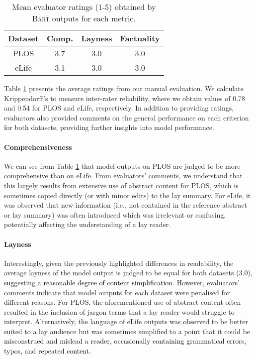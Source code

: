 \documentclass[11pt]{article}
\begin{document}
\begin{table}[]
    \centering
    \begin{tabular}{cccc}
         \hline
         \textbf{Dataset} & \textbf{Comp.} & \textbf{Layness} &\textbf{Factuality} \\ \hline
         PLOS & 3.7 & 3.0 & 3.0 \\
         eLife & 3.1 & 3.0 & 3.0 \\ \hline 
    \end{tabular}
    \caption{Mean evaluator ratings (1-5) obtained by \textsc{Bart} outputs for each metric.}
    \label{tab:human_eval}
\end{table}

Table \ref{tab:human_eval} presents the average ratings from our manual evaluation. We calculate Krippendorff's  to measure inter-rater reliability, where we obtain values of 0.78 and 0.54 for PLOS and eLife, respectively. In addition to providing ratings, evaluators also provided comments on the general performance on each criterion for both datasets, providing further insights into model performance.


\paragraph{Comprehensiveness}


We can see from Table \ref{tab:human_eval} that model outputs on PLOS are judged to be more comprehensive than on eLife. From evaluators' comments, we understand that this largely results from extensive use of abstract content for PLOS, which is sometimes copied directly (or with minor edits) to the lay summary.  
For eLife, it was observed that new information (i.e., not contained in the reference abstract or lay summary) was often introduced which was irrelevant or confusing, potentially affecting the understanding of a lay reader.


\paragraph{Layness}
Interestingly, given the previously highlighted differences in readability, the average layness of the model output is judged to be equal for both datasets (3.0), \textcolor{black}{suggesting a reasonable degree of content simplification.}  
However, evaluators' comments indicate that model outputs for each dataset were penalised for different reasons. For PLOS, the aforementioned use of abstract content often resulted in the inclusion of jargon terms that a lay reader would struggle to interpret. Alternatively, the language of eLife outputs was observed to be better suited to a lay audience but was sometimes simplified to a point that it could be \textcolor{black}{misconstrued and mislead a reader, occasionally containing grammatical errors, typos, and repeated content.} 
\end{document}
